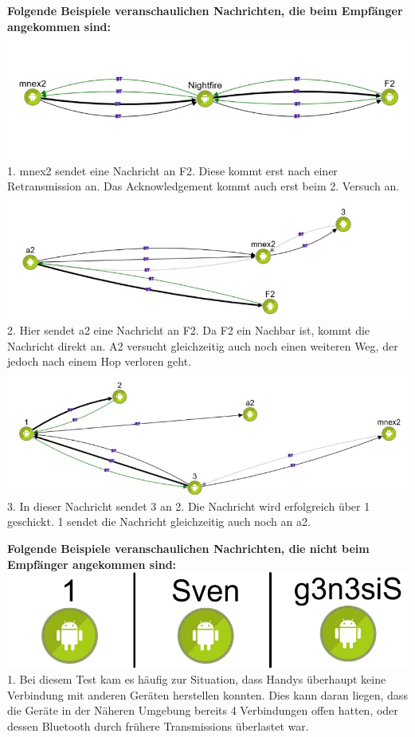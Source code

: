 \textbf{Folgende Beispiele veranschaulichen Nachrichten, die beim
Empfänger angekommen sind:}
\includegraphics[width=1.0\textwidth]{belege/grosstests/Bilder/Grosstest2/Test1Erfolg2.jpg}
1. mnex2 sendet eine Nachricht an F2. Diese kommt erst nach einer
Retransmission an. Das Acknowledgement kommt auch erst beim 2. Versuch
an.
\includegraphics[width=1.0\textwidth]{belege/grosstests/Bilder/Grosstest2/Test1Erfolg1.jpg}
2. Hier sendet a2 eine Nachricht an F2. Da F2 ein Nachbar ist, kommt die
Nachricht direkt an. A2 versucht gleichzeitig auch noch einen weiteren
Weg, der jedoch nach einem Hop verloren geht.
\includegraphics[width=1.0\textwidth]{belege/grosstests/Bilder/Grosstest2/Test1Erfolg3.jpg}
3. In dieser Nachricht sendet 3 an 2. Die Nachricht wird erfolgreich über 1
geschickt. 1 sendet die Nachricht gleichzeitig auch noch an a2.

\textbf{Folgende Beispiele veranschaulichen Nachrichten, die nicht beim
Empfänger angekommen sind:}
\includegraphics[width=1.0\textwidth]{belege/grosstests/Bilder/Grosstest2/Test1Misserfolg2.jpg}
1. Bei diesem Test kam es häufig zur Situation, dass Handys überhaupt keine
Verbindung mit anderen Geräten herstellen konnten. Dies kann daran
liegen, dass die Geräte in der Näheren Umgebung bereits 4 Verbindungen
offen hatten, oder dessen Bluetooth durch frühere Transmissions
überlastet war.

